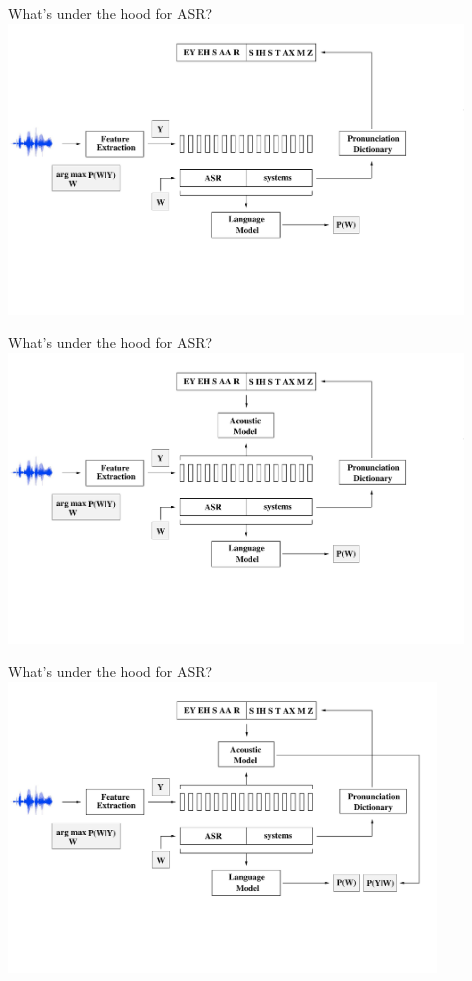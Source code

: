 \begin{frame}{What's under the hood for ASR?}
\includegraphics[height=77mm]{figures/ASR6}
\end{frame}

\begin{frame}{What's under the hood for ASR?}
\includegraphics[height=77mm]{figures/ASR7}
\end{frame}

\begin{frame}{What's under the hood for ASR?}
\includegraphics[height=77mm]{figures/ASR8}
\end{frame}

